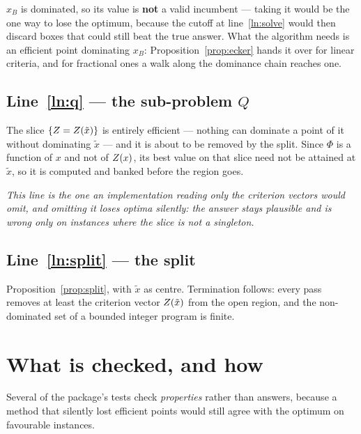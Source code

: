\documentclass[11pt,a4paper]{article}
\begin{document}
$x_B$ is dominated, so its value is \textbf{not} a valid incumbent --- taking
it would be the one way to lose the optimum, because the cutoff at
line~\ref{ln:solve} would then discard boxes that could still beat the true
answer.  What the algorithm needs is an efficient point dominating $x_B$:
Proposition~\ref{prop:ecker} hands it over for linear criteria, and for
fractional ones a walk along the dominance chain reaches one.

\subsection{Line~\ref{ln:q} --- the sub-problem $Q$}

The slice $\{Z = Z(\tilde{x})\}$ is entirely efficient --- nothing can
dominate a point of it without dominating $\tilde{x}$ --- and it is about to be
removed by the split.  Since $\Phi$ is a function of $x$ and not of $Z(x)$,
its best value on that slice need not be attained at $\tilde{x}$, so it is
computed and banked before the region goes.

\emph{This line is the one an implementation reading only the criterion vectors
would omit, and omitting it loses optima silently: the answer stays plausible
and is wrong only on instances where the slice is not a singleton.}

\subsection{Line~\ref{ln:split} --- the split}

Proposition~\ref{prop:split}, with $\tilde{x}$ as centre.  Termination follows:
every pass removes at least the criterion vector $Z(\tilde{x})$ from the open
region, and the non-dominated set of a bounded integer program is finite.

\section{What is checked, and how}

Several of the package's tests check \emph{properties} rather than answers,
because a method that silently lost efficient points would still agree with the
optimum on favourable instances.
\end{document}
